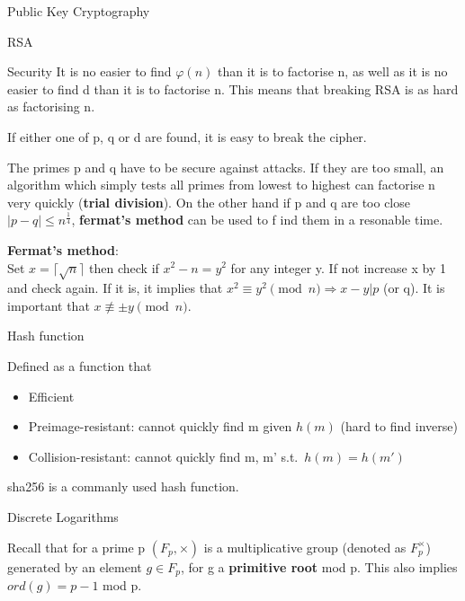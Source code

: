 \documentclass[12pt, letterpaper]{article}
\begin{document}
\begin{section}{Public Key Cryptography}
\begin{subsection}{RSA}
\begin{subsubsection}{Security}
      It is no easier to find \(\varphi(n)\) than it is to factorise n, as well
      as it is no easier to find d than it is to factorise n. This means that
      breaking RSA is as hard as factorising n.

      If either one of p, q or d are found, it is easy to break the cipher.

      The primes p and q have to be secure against attacks. If they are too
      small, an algorithm which simply tests all primes from lowest to highest
      can factorise n very quickly (\textbf{trial division}). On the other hand
      if p and q are too close \(|p - q| \leq n^{\frac{1}{4}}\),
      \textbf{fermat's method} can be used to f ind them in a resonable time.

      \textbf{Fermat's method}: \\
      Set \(x = \lceil \sqrt{n} \rceil\) then check if \(x^{2} - n = y^{2}\)
      for any integer y. If not increase x by 1 and check again. If it is,
      it implies that \(x^{2} \equiv y^{2} \pmod{n} \Rightarrow x - y | p\)
      (or q). It is important that \(x \not\equiv \pm y \pmod{n}\).

    \end{subsubsection}

  \end{subsection}

  \begin{subsection}{Hash function}

    Defined as a function that
    \begin{itemize}
      \item Efficient
      \item Preimage-resistant: cannot quickly find m given \(h(m)\)
            (hard to find inverse)
      \item Collision-resistant: cannot quickly find m, m' s.t.\
            \(h(m) = h(m')\)
    \end{itemize}

    sha256 is a commanly used hash function.

  \end{subsection}

  \begin{subsection}{Discrete Logarithms}

    Recall that for a prime p \((F_{p}, \times)\) is a multiplicative group
    (denoted as \(F_{p}^{\times}\)) generated by an element \(g \in F_{p}\),
    for g a \textbf{primitive root} mod p. This also implies \(ord(g) = p - 1\)
    mod p.


\end{subsection}
\end{section}
\end{document}
